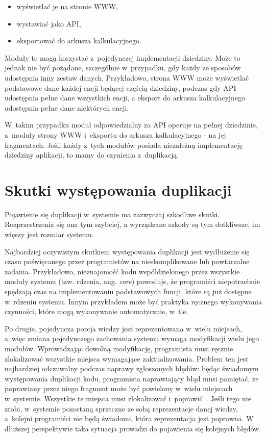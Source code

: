 \begin{itemize}
 \item wyświetlać je na stronie WWW,
 \item wystawiać jako API,
 \item eksportować do arkusza kalkulacyjnego.
\end{itemize}

Moduły te mogą korzystać z~pojedynczej implementacji dziedziny.
Może to jednak nie być pożądane, szczególnie w~przypadku, gdy każdy ze sposobów udostępnia inny zestaw danych.
Przykładowo, strona WWW może wyświetlać podstawowe dane każdej encji będącej częścią dziedziny, podczas gdy API udostępnia pełne dane wszystkich encji, a eksport do arkusza kalkulacyjnego udostępnia pełne dane niektórych encji.

W~takim przypadku moduł odpowiedzialny za API operuje na pełnej dziedzinie, a~moduły strony WWW i~eksportu do arkusza kalkulacyjnego  - na jej fragmentach.
Jeśli każdy z~tych modułów posiada niezależną implementację dziedziny aplikacji, to mamy do czynienia z~duplikacją.



\section{Skutki występowania duplikacji}

Pojawienie się duplikacji w~systemie ma zazwyczaj szkodliwe skutki.
Rozprzestrzenia się ona tym szybciej, a wyrządzane szkody są tym dotkliwsze, im więszy jest rozmiar systemu.

Najbardziej oczywistym skutkiem występowania duplikacji jest wydłużenie się czasu poświęcanego przez programistów na nieskomplikowane lub powtarzalne zadania.
Przykładowo, nieznajomość kodu współdzielonego przez wszystkie moduły systemu (tzw. rdzenia, ang. \emph{core}) powoduje, że programiści niepotrzebnie spędzają czas na implementowaniu podstawowych funcji, które są już dostępne w~rdzeniu systemu.
Innym przykładem może być praktyka ręcznego wykonywania czynności, które mogą wykonywanie automatycznie, w~tle.

Po drugie, pojedyncza porcja wiedzy jest reprezentowana w~wielu miejsach, a~więc zmiana pojedynczego zachowania systemu wymaga modyfikacji wielu jego modułów.
Wprowadzając dowolną modyfikację, programista musi ręcznie zlokalizować wszystkie miejsca wymagające zaktualizowania.
Problem ten jest najbardziej odczuwalny podczas naprawy zgłoszonych błędów: będąc świadomym występowania duplikacji kodu, programista naprawiający błąd musi pamiętać, że poprawiany przez niego fragment może być powielony w~wielu miejscach w~systemie.
Wszystkie te miejsca musi zlokalizować i~poprawić~\cite{repetition}.
Jeśli tego nie zrobi, w~systemie pozostaną sprzeczne ze sobą reprezentacje danej wiedzy, a~kolejni programiści nie będą świadomi, która reprezentacja jest poprawna.
W dłuższej perspektywie taka sytuacja prowadzi do pojawienia się kolejnych błędów.

